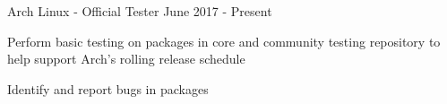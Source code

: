 
\begin{cventries}

  \bproject
    {Arch Linux - Official Tester}
    {June 2017 - Present} %
    {
      \begin{cvitems} %
        \item {Perform basic testing on packages in core and community testing repository to help support Arch's rolling release schedule}
        \item {Identify and report bugs in packages}
      \end{cvitems}
    }

\end{cventries}
